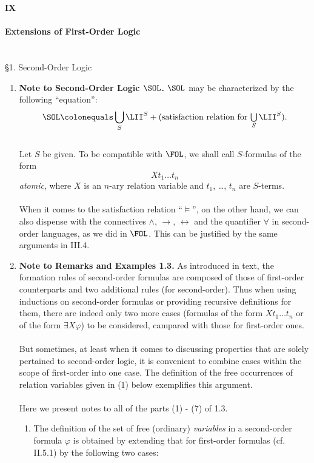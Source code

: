 {\LARGE \bfseries IX \\ \\ Extensions of First-Order Logic}
\\
\\
\\
{\large \S1. Second-Order Logic}
\begin{enumerate}[1.]
\item \textbf{Note to Second-Order Logic $\SOL$.} $\SOL$ may be characterized by the following ``equation'':
\[
\SOL \colonequals \bigcup\limits_S \LII^S + (\mbox{satisfaction relation for $\bigcup\limits_S \LII^S$}).
\]
\ \\
Let $S$ be given. To be compatible with $\FOL$, we shall call $S$-formulas of the form
\[
Xt_1 \ldots t_n
\]
\emph{atomic}, where $X$ is an $n$-ary relation variable and $t_1$, \ldots, $t_n$ are $S$-terms.\\
\ \\
When it comes to the satisfaction relation ``$\models$'', on the other hand, we can also dispense with the connectives $\land$, $\rightarrow$, $\leftrightarrow$ and the quantifier $\forall$ in second-order languages, as we did in $\FOL$. This can be justified by the same arguments in III.4.
%
\item \textbf{Note to Remarks and Examples 1.3.} As introduced in text, the formation rules of second-order formulas are composed of those of first-order counterparts and two additional rules (for second-order). Thus when using inductions on second-order formulas or providing recursive definitions for them, there are indeed only two more cases (formulas of the form $X t_1 \ldots t_n$ or of the form $\exists X \varphi$) to be considered, campared with those for first-order ones.\\
\\
But sometimes, at least when it comes to discussing properties that are solely pertained to second-order logic, it is convenient to combine cases within the scope of first-order into one case. The definition of the free occurrences of relation variables given in (1) below exemplifies this argument.\\
\\
Here we present notes to all of the parts (1) - (7) of 1.3.
\begin{enumerate}[(1)]
\item The definition of the set of free (ordinary) \emph{variables} in a second-order formula $\varphi$ is obtained by extending that for first-order formulas (cf. II.5.1) by the following two cases:

\end{enumerate}
\end{enumerate}
